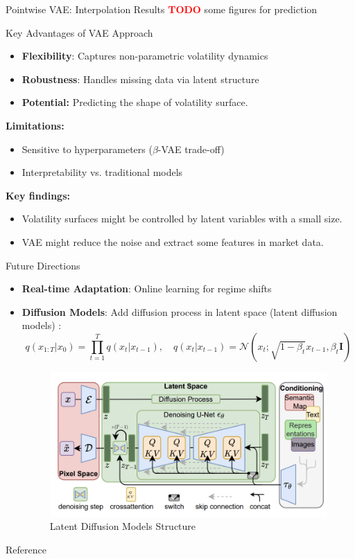 \documentclass{beamer}
\newcommand\todo{\textcolor{red}{\textbf{TODO}}}
\begin{document}
\begin{frame}{Pointwise VAE: Interpolation Results}
\todo
some figures for prediction

\end{frame}

\begin{frame}{Key Advantages of VAE Approach}
\begin{itemize}
    \item \textbf{Flexibility}: Captures non-parametric volatility dynamics
    
    \item \textbf{Robustness}: Handles missing data via latent structure

    \item \textbf{Potential:} Predicting the shape of volatility surface.
\end{itemize}
\vspace{0.5cm}
\textbf{Limitations:}
\begin{itemize}
    \item Sensitive to hyperparameters (\(\beta\)-VAE trade-off)
    \item Interpretability vs. traditional models
\end{itemize}
\textbf{Key findings:}
\begin{itemize}
    \item Volatility surfaces might be controlled by latent variables with a small size.
    \item VAE might reduce the noise and extract some features in market data.
\end{itemize}
\end{frame}

\begin{frame}{Future Directions}
\begin{itemize}
\item \textbf{Real-time Adaptation}: Online learning for regime shifts
    \item \textbf{Diffusion Models}: Add diffusion process in latent space (latent diffusion models) :
    \[
    q(x_{1:T}|x_0) = \prod_{t=1}^T q(x_t|x_{t-1}), \quad q(x_t|x_{t-1}) = \mathcal{N}(x_t; \sqrt{1-\beta_t}x_{t-1}, \beta_t \mathbf{I})
    \]
\begin{figure}
    \centering
    \includegraphics[width=0.6\linewidth]{docs/proposal/img/ldm.png}
    \caption{Latent Diffusion Models Structure}
    \label{fig:enter-label}
\end{figure}
\end{itemize}



\end{frame}

\begin{frame}{Reference}
    
    
\end{frame}
\end{document}
